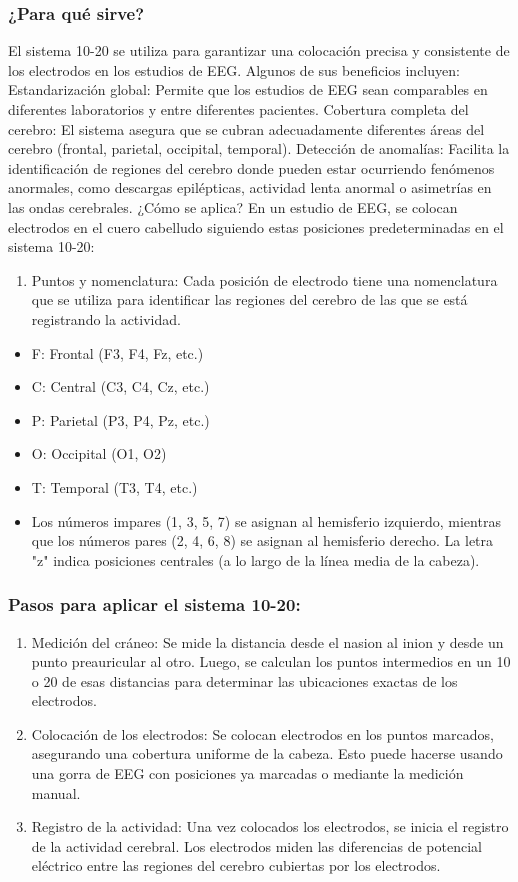 \documentclass{article}
\begin{document}
\subsubsection{¿Para qué sirve?}
El sistema 10-20 se utiliza para garantizar una colocación precisa y consistente de los electrodos en los estudios de EEG. Algunos de sus beneficios incluyen:
Estandarización global: Permite que los estudios de EEG sean comparables en diferentes laboratorios y entre diferentes pacientes.
Cobertura completa del cerebro: El sistema asegura que se cubran adecuadamente diferentes áreas del cerebro (frontal, parietal, occipital, temporal).
Detección de anomalías: Facilita la identificación de regiones del cerebro donde pueden estar ocurriendo fenómenos anormales, como descargas epilépticas, actividad lenta anormal o asimetrías en las ondas cerebrales.
¿Cómo se aplica?
En un estudio de EEG, se colocan electrodos en el cuero cabelludo siguiendo estas posiciones predeterminadas en el sistema 10-20:
\begin{enumerate}
    \item Puntos y nomenclatura: Cada posición de electrodo tiene una nomenclatura que se utiliza para identificar las regiones del cerebro de las que se está registrando la actividad.
\end{enumerate}
\begin{itemize}
    \item F: Frontal (F3, F4, Fz, etc.)
    \item C: Central (C3, C4, Cz, etc.)
    \item P: Parietal (P3, P4, Pz, etc.)
    \item O: Occipital (O1, O2)
    \item T: Temporal (T3, T4, etc.)
    \item Los números impares (1, 3, 5, 7) se asignan al hemisferio izquierdo, mientras que los números pares (2, 4, 6, 8) se asignan al hemisferio derecho. La letra "z" indica posiciones centrales (a lo largo de la línea media de la cabeza).
\end{itemize}

\subsubsection{Pasos para aplicar el sistema 10-20:}
\begin{enumerate}
    \item Medición del cráneo: Se mide la distancia desde el nasion al inion y desde un punto preauricular al otro. Luego, se calculan los puntos intermedios en un 10 o 20 de esas distancias para determinar las ubicaciones exactas de los electrodos.
    \item Colocación de los electrodos: Se colocan electrodos en los puntos marcados, asegurando una cobertura uniforme de la cabeza. Esto puede hacerse usando una gorra de EEG con posiciones ya marcadas o mediante la medición manual.
    \item Registro de la actividad: Una vez colocados los electrodos, se inicia el registro de la actividad cerebral. Los electrodos miden las diferencias de potencial eléctrico entre las regiones del cerebro cubiertas por los electrodos.
\end{enumerate}
\end{document}
